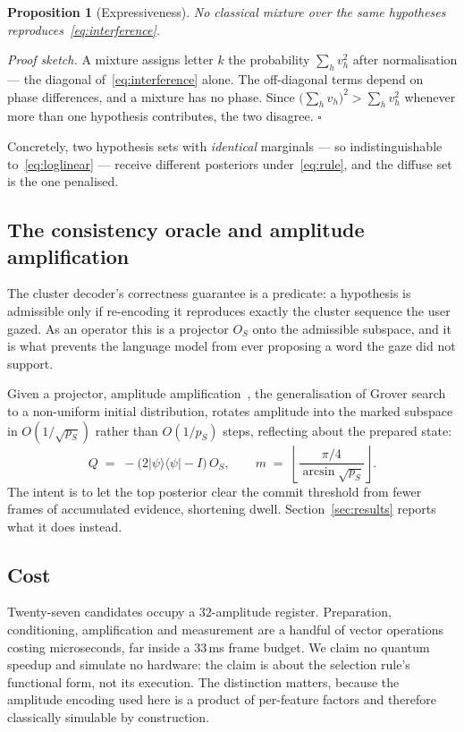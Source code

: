 \documentclass[conference]{IEEEtran}
\newtheorem{proposition}{Proposition}
\begin{document}
\begin{proposition}[Expressiveness]
\label{prop:express}
No classical mixture over the same hypotheses reproduces~\eqref{eq:interference}.
\end{proposition}

\noindent\emph{Proof sketch.} A mixture assigns letter $k$ the probability
$\sum_h v_h^{2}$ after normalisation --- the diagonal of~\eqref{eq:interference}
alone. The off-diagonal terms depend on phase differences, and a mixture has no
phase. Since $\big(\sum_h v_h\big)^{2} > \sum_h v_h^{2}$ whenever more than one
hypothesis contributes, the two disagree. $\square$

Concretely, two hypothesis sets with \emph{identical} marginals --- so
indistinguishable to~\eqref{eq:loglinear} --- receive different posteriors
under~\eqref{eq:rule}, and the diffuse set is the one penalised.

\subsection{The consistency oracle and amplitude amplification}

The cluster decoder's correctness guarantee is a predicate: a hypothesis is
admissible only if re-encoding it reproduces exactly the cluster sequence the
user gazed. As an operator this is a projector $O_S$ onto the admissible
subspace, and it is what prevents the language model from ever proposing a word
the gaze did not support.

Given a projector, amplitude amplification~\cite{ref13}, the generalisation of
Grover search~\cite{ref14} to a non-uniform initial distribution, rotates
amplitude into the marked subspace in $O(1/\sqrt{p_S})$ rather than $O(1/p_S)$
steps, reflecting about the prepared state:
\begin{equation}
Q \;=\; -\big(2\lvert\psi\rangle\langle\psi\rvert - I\big)\, O_S ,
\qquad
m \;=\; \left\lfloor \frac{\pi/4}{\arcsin\sqrt{p_S}} \right\rfloor .
\end{equation}
The intent is to let the top posterior clear the commit threshold from fewer
frames of accumulated evidence, shortening dwell. Section~\ref{sec:results}
reports what it does instead.

\subsection{Cost}

Twenty-seven candidates occupy a $32$-amplitude register. Preparation,
conditioning, amplification and measurement are a handful of vector operations
costing microseconds, far inside a $33$\,ms frame budget. We claim no quantum
speedup and simulate no hardware: the claim is about the selection rule's
functional form, not its execution. The distinction matters, because the
amplitude encoding used here is a product of per-feature factors and therefore
classically simulable by construction.
\end{document}
